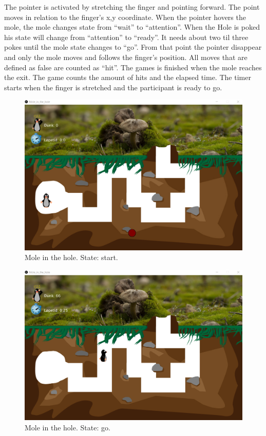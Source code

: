The pointer is activated by stretching the finger and pointing forward. The point moves in relation to the finger’s x,y coordinate. When the pointer hovers the mole, the mole changes state from “wait” to “attention”. When the Hole is poked his state will change from “attention” to “ready”. It needs about two til three pokes until the mole state changes to “go”. From that point the pointer disappear and only the mole moves and follows the finger’s position. All moves that are defined as false are counted as “hit”. The games is finished when the mole reaches the exit. The game counts the amount of hits and the elapsed time. The timer starts when the finger is stretched and the participant is ready to go.

\begin{figure}[h]  %
  \centering
  \includegraphics[width=.5\textwidth]{figures/StateStart-Mole_in_the_hole.png}
  \caption[Mole in the hole state start.]{Mole in the hole. State: start.}
  \label{fig:stateStart-Mole_in_the_hole}
\end{figure}
\begin{figure}[h]  %
  \centering
  \includegraphics[width=.5\textwidth]{figures/StateGo-Mole_in_the_hole.png}
  \caption[Mole in the hole state go.]{Mole in the hole. State: go.}
  \label{fig:stateGo-Mole_in_the_hole}
\end{figure}
